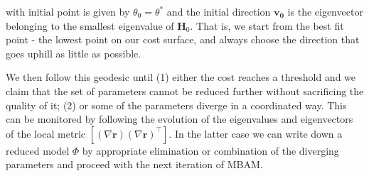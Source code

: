 \documentclass[10pt]{amsart}
\begin{document}
	with initial point is given by $\theta_0 = \theta^*$ and the initial direction $\mathbf{v_0}$ is the eigenvector belonging to the smallest eigenvalue of $\mathbf{H}_0$. That is, we start from the best fit point - the lowest point on our cost surface, and always choose the direction that goes uphill as little as possible.

	We then follow this geodesic until (1) either the cost reaches a threshold and we claim that the set of parameters cannot be reduced further without sacrificing the quality of it; (2) or some of the parameters diverge in a coordinated way. This can be monitored by following the evolution of the eigenvalues and eigenvectors of the local metric $[(\nabla \mathbf{r}) (\nabla \mathbf{r})^\top]$. In the latter case we can write down a reduced model $\Phi$ by appropriate elimination or combination of the diverging parameters and proceed with the next iteration of MBAM.
\end{document}
